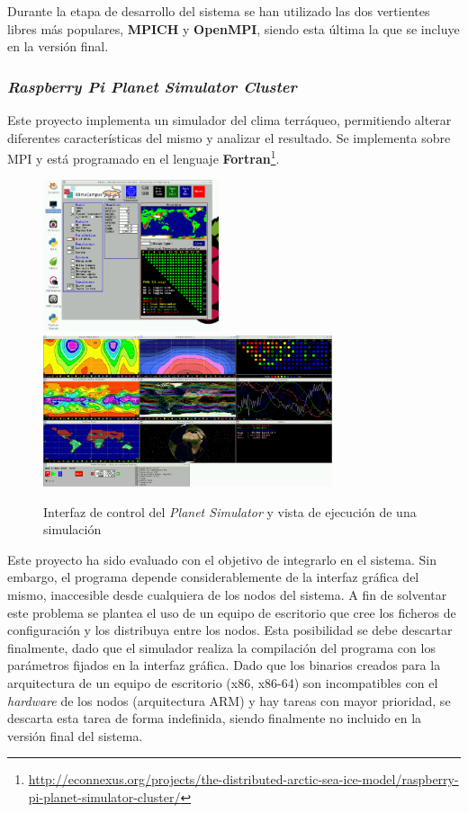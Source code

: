 \vspace{1cm}

Durante la etapa de desarrollo del sistema se han utilizado las dos vertientes libres más populares, \textbf{MPICH} y \textbf{OpenMPI}, siendo esta última la que se incluye en la versión final.

\subsubsection{\textit{Raspberry Pi Planet Simulator Cluster}}

Este proyecto implementa un simulador del clima terráqueo, permitiendo alterar diferentes características del mismo y analizar el resultado. Se implementa sobre MPI y está programado en el lenguaje \textbf{Fortran}\footnote{\href{http://econnexus.org/projects/the-distributed-arctic-sea-ice-model/raspberry-pi-planet-simulator-cluster/}{http://econnexus.org/projects/the-distributed-arctic-sea-ice-model/raspberry-pi-planet-simulator-cluster/}}.

\begin{figure}[H]
	\includegraphics[height=12em]{Chapters/Chapter3/Figures/plasim-main}
	\includegraphics[height=12em]{Chapters/Chapter3/Figures/plasim-results}
	\label{fig:plasim}
	\caption[Interfaz de la aplicación \textit{Planet Simulator}]{Interfaz de control del \textit{Planet Simulator} y vista de ejecución de una simulación}
\end{figure}

Este proyecto ha sido evaluado con el objetivo de integrarlo en el sistema. Sin embargo, el programa depende considerablemente de la interfaz gráfica del mismo, inaccesible desde cualquiera de los nodos del sistema. A fin de solventar este problema se plantea el uso de un equipo de escritorio que cree los ficheros de configuración y los distribuya entre los nodos. Esta posibilidad se debe descartar finalmente, dado que el simulador realiza la compilación del programa con los parámetros fijados en la interfaz gráfica. Dado que los binarios creados para la arquitectura de un equipo de escritorio (x86, x86-64) son incompatibles con el \textit{hardware} de los nodos (arquitectura ARM) y hay tareas con mayor prioridad, se descarta esta tarea de forma indefinida, siendo finalmente no incluido en la versión final del sistema.

